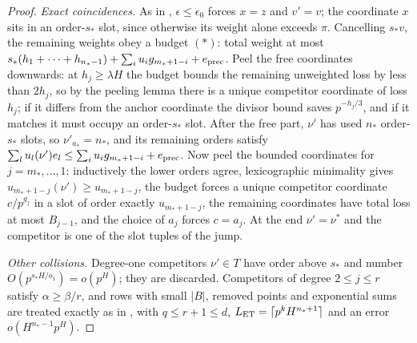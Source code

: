 \documentclass[11pt]{article}
\begin{document}
\begin{proof}
\emph{Exact coincidences.} As in , $\epsilon\le\epsilon_0$ forces $x=z$ and $v'=v$; the
coordinate $x$ sits in an order-$s_*$ slot, since otherwise its weight alone exceeds $\pi$. Cancelling $s_*v$,
the remaining weights obey a budget $(*)$: total weight at most
$s_*(h_1+\cdots+h_{n_*-1})+\sum_iu_ig_{m_*+1-i}+e_{\rm prec}$. Peel the free coordinates downwards: at
$h_j\ge\lambda H$ the budget bounds the remaining unweighted loss by less than $2h_j$, so by the peeling lemma
there is a unique competitor coordinate of loss $h_j$; if it differs from the anchor coordinate the divisor
bound saves $p^{-h_j/3}$, and if it matches it must occupy an order-$s_*$ slot. After the free part, $\nu'$
has used $n_*$ order-$s_*$ slots, so $\nu'_{a_*}=n_*$, and its remaining orders satisfy
$\sum_lu_l(\nu')e_l\le\sum_iu_ig_{m_*+1-i}+e_{\rm prec}$. Now peel the bounded coordinates for
$j=m_*,\ldots,1$: inductively the lower orders agree, lexicographic minimality gives
$u_{m_*+1-j}(\nu')\ge u_{m_*+1-j}$, the budget forces a unique competitor coordinate $c/p^{g_j}$ in a slot of
order exactly $u_{m_*+1-j}$, the remaining coordinates have total loss at most $B_{j-1}$, and the choice of
$a_j$ forces $c=a_j$. At the end $\nu'=\nu^*$ and the competitor is one of the slot tuples of the jump.

\emph{Other collisions.} Degree-one competitors $\nu'\in T$ have order above $s_*$ and number
$O(p^{s_*H/o_1})=o(p^H)$; they are discarded. Competitors of degree $2\le j\le r$ satisfy $\alpha\ge\beta/r$,
and rows with small $|B|$, removed points and exponential sums are treated exactly as in
, with $q\le r+1\le d$, $L_{\rm ET}=\lceil p^kH^{n_*+1}\rceil$ and an error
$o(H^{n_*-1}p^H)$.


\end{proof}
\end{document}
